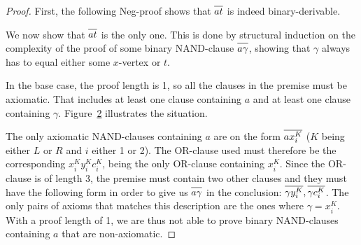 \begin{proof}
First, the following Neg-proof shows that $\ol{at}$ is indeed binary-derivable.
\begin{figure}[!h]
  \centering
  \begin{prooftree*}[separation=0.8em, rule margin=1ex]
  \end{prooftree*}
  \caption{}
  \label{fig:at_binary_proof}
\end{figure}
\FloatBarrier
We now show that $\ol{at}$ is the only one.
This is done by structural induction on the complexity of the proof of some binary NAND-clause $\ol{a\gamma}$, showing that $\gamma$ always has to equal either some $x$-vertex or $t$.

In the base case, the proof length is 1, so all the clauses in the premise must be axiomatic.
That includes at least one clause containing $a$ and at least one clause containing $\gamma$.
Figure~\ref{fig:nand_base_case} illustrates the situation.\par
\begin{figure}[!h]
  \centering
  \begin{prooftree*}
  \end{prooftree*}
  \caption{}
  \label{fig:nand_base_case}
\end{figure}
\FloatBarrier
The only axiomatic NAND-clauses containing $a$ are on the form $\ol{ax^K_i}$ ($K$ being either $L$ or $R$ and $i$ either 1 or 2).
The OR-clause used must therefore be the corresponding $x^K_iy^K_ic^K_i$, being the only OR-clause containing $x^K_i$.
Since the OR-clause is of length 3, the premise must contain two other clauses and they must have the following form in order to give us $\ol{a \gamma}$ in the conclusion:
$\ol{\gamma y^K_i},\ol{\gamma c^K_i}$.
The only pairs of axioms that matches this description are the ones where $\gamma = x^K_i$.
With a proof length of 1, we are thus not able to prove binary NAND-clauses containing $a$ that are non-axiomatic.


\end{proof}
